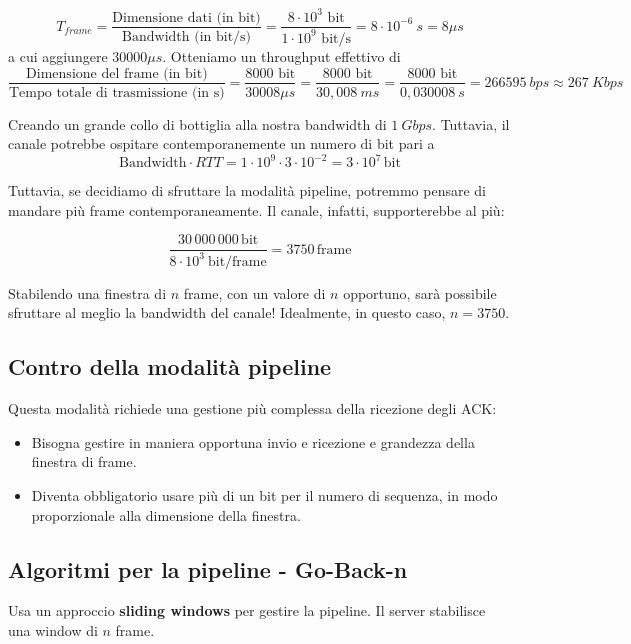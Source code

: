 $$
T_{frame} = \frac{\text{Dimensione dati (in bit)}}{\text{Bandwidth (in bit/s)}} = \frac{8\cdot 10^3 \text{ bit}}{1\cdot10^9 \text{ bit/s}}= 8\cdot 10^{-6} \ s = 8 \mu s
$$
a cui aggiungere $30000 \mu s$. Otteniamo un throughput effettivo di
$$
\frac{\text{Dimensione del frame (in bit)}}{\text{Tempo totale di trasmissione (in s)}} = \frac{8000 \text{ bit}}{30008 \mu s} = \frac{8000 \text{ bit}}{30,008 \ ms} = \frac{8000 \text{ bit}}{0,030008 \ s} = 266595 \ bps \approx 267 \ Kbps
$$

Creando un grande collo di bottiglia alla nostra bandwidth di $1 \ Gbps$. Tuttavia, il canale potrebbe ospitare contemporanemente un numero di bit pari a 
$$
\text{Bandwidth} \cdot RTT = 1\cdot 10^9 \cdot 3\cdot 10^{-2} = 3 \cdot 10 ^7 \, \text{bit}
$$

Tuttavia, se decidiamo di sfruttare la modalità pipeline, potremmo pensare di mandare più frame contemporaneamente. Il canale, infatti, supporterebbe al più:

$$
\frac{30\,000\,000 \, \text{bit}}{8\cdot 10^3 \ \text{bit/frame}} = 3750 \, \text{frame}
$$

Stabilendo una finestra di $n$ frame, con un valore di $n$ opportuno, sarà possibile sfruttare al meglio la bandwidth del canale! Idealmente, in questo caso, $n=3750$.

\subsection{Contro della modalità pipeline}
Questa modalità richiede una gestione più complessa della ricezione degli ACK: 
\begin{itemize}
	\item Bisogna gestire in maniera opportuna invio e ricezione e grandezza della finestra di frame.
	\item Diventa obbligatorio usare più di un bit per il numero di sequenza, in modo proporzionale alla dimensione della finestra.
\end{itemize}

\newpage


\subsection{Algoritmi per la pipeline - Go-Back-n}
Usa un approccio \textbf{sliding windows} per gestire la pipeline.
Il server stabilisce una window di $n$ frame.
